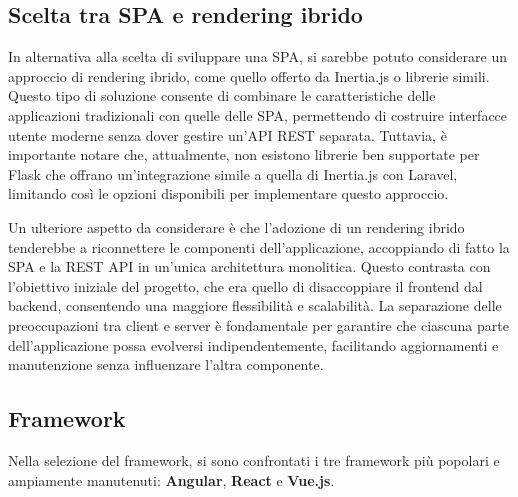 \subsection{Scelta tra SPA e rendering ibrido}
In alternativa alla scelta di sviluppare una SPA, si sarebbe potuto considerare un approccio di rendering ibrido, come quello offerto da Inertia.js o librerie simili. Questo tipo di soluzione consente di combinare le caratteristiche delle applicazioni tradizionali con quelle delle SPA, permettendo di costruire interfacce utente moderne senza dover gestire un'API REST separata. Tuttavia, è importante notare che, attualmente, non esistono librerie ben supportate per Flask che offrano un'integrazione simile a quella di Inertia.js con Laravel, limitando così le opzioni disponibili per implementare questo approccio.

Un ulteriore aspetto da considerare è che l'adozione di un rendering ibrido tenderebbe a riconnettere le componenti dell'applicazione, accoppiando di fatto la SPA e la REST API in un'unica architettura monolitica. Questo contrasta con l'obiettivo iniziale del progetto, che era quello di disaccoppiare il frontend dal backend, consentendo una maggiore flessibilità e scalabilità. La separazione delle preoccupazioni tra client e server è fondamentale per garantire che ciascuna parte dell'applicazione possa evolversi indipendentemente, facilitando aggiornamenti e manutenzione senza influenzare l'altra componente.

\subsection{Framework}
Nella selezione del framework, si sono confrontati i tre framework più popolari e ampiamente manutenuti: \textbf{Angular}, \textbf{React} e \textbf{Vue.js}.

